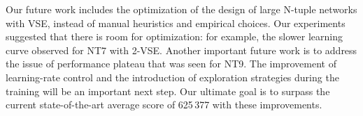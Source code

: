 Our future work includes the optimization of the design of large N-tuple networks with VSE, instead of manual heuristics and empirical choices.
Our experiments suggested that there is room for optimization: for example, the slower learning curve observed for \textsf{NT7} with 2-VSE.
Another important future work is to address the issue of performance plateau that was seen for NT9.
The improvement of learning-rate control and the introduction of exploration strategies during the training will be an important next step.
Our ultimate goal is to surpass the current state-of-the-art average score of 625\,377 with these improvements.



